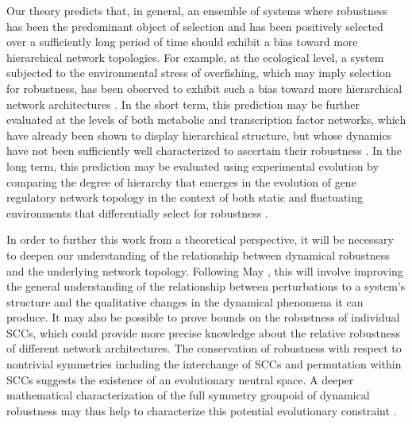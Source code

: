 Our theory predicts that, in general, an ensemble of systems where robustness has been the predominant object of selection and has been positively selected over a sufficiently long period of time should exhibit a bias toward more hierarchical network topologies. For example, at the ecological level, a system subjected to the environmental stress of overfishing, which may imply selection for robustness, has been observed to exhibit such a bias toward more hierarchical network architectures \cite{Bascompte2005}. In the short term, this prediction may be further evaluated at the levels of both metabolic and transcription factor networks, which have already been shown to display hierarchical structure, but whose dynamics have not been sufficiently well characterized to ascertain their robustness \cite{Zhao2006,Bhardwaj2010,Colm}.
In the long term, this prediction may be evaluated using experimental evolution by comparing the degree of hierarchy that emerges in the evolution of gene regulatory network topology in the context of both static and fluctuating environments that differentially select for robustness \cite{Leroi1994}.

In order to further this work from a theoretical perspective, it will be necessary to deepen our understanding of the relationship between dynamical robustness and the underlying network topology. Following May \cite{Cohen1984,May1972a,Radius2014,Majumdar2014}, this will involve improving the general understanding of the relationship between perturbations to a system's structure and the qualitative changes in the dynamical phenomena it can produce.
It may also be possible to prove bounds on the robustness of individual SCCs, which could provide more precise knowledge about the relative robustness of different network architectures. The conservation of robustness with respect to nontrivial symmetries including the interchange of SCCs and permutation within SCCs suggests the existence of an evolutionary neutral space. A deeper mathematical characterization of the full symmetry groupoid of dynamical robustness may thus help to characterize this potential evolutionary constraint \cite{Golubitsky2006}.

